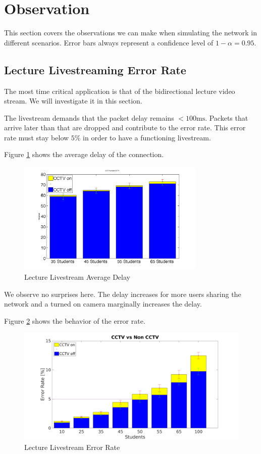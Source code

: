 \documentclass[a4paper]{scrreprt}
\begin{document}
	\section{Observation}\label{chp:observations}
		This section covers the observations we can make when simulating the network in different scenarios. Error bars always represent a confidence level of $1-\alpha =0.95$.
		
		\subsection{Lecture Livestreaming Error Rate}\label{sec:errorrate}
			The most time critical application is that of the bidirectional lecture video stream. We will investigate it in this section. 
			
			The livestream demands that the packet delay remains $<100\text{ms}$. Packets that arrive later than that are dropped and contribute to the error rate. This error rate must stay below $5\%$ in order to have a functioning livestream. 
			
			Figure \ref{fig:delay} shows the average delay of the connection.
			\begin{figure}[H]
				\center\includegraphics[width=0.8\textwidth]{../Results_Analysis/Delay/delay_combined_plot.png}
				\caption{Lecture Livestream Average Delay}
				\label{fig:delay}
			\end{figure}					
			
			We observe no surprises here. The delay increases for more users sharing the network and a turned on camera marginally increases the delay.
			
			Figure \ref{fig:errorrate} shows the behavior of the error rate. 		
			\begin{figure}[H]
				\center\includegraphics[width=\textwidth]{../Results_Analysis/Combining_1st_3rd_analysis/plot_all.png}
				\caption{Lecture Livestream Error Rate}
				\label{fig:errorrate}
			\end{figure}
			
\end{document}
